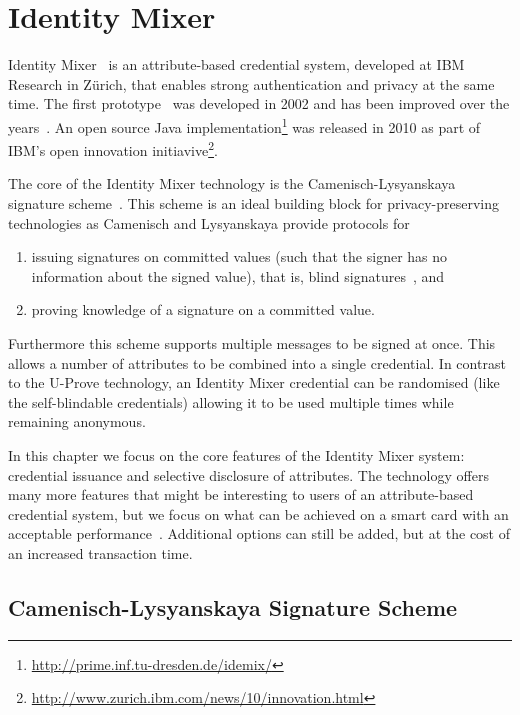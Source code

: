 \chapter{Identity Mixer\label{chp:idemix}}

Identity Mixer~\cite{CamenischLysyanskaya2001,IdemixCrypto2012} is an
attribute-based credential system, developed at IBM Research in Z\"urich, that
enables strong authentication and privacy at the same time. The first
prototype~\cite{CamenischH02} was developed in 2002 and has been improved over
the years~\cite{BrickellCC2004,CamenischGroth2004}. An open source Java
implementation\footnote{\url{http://prime.inf.tu-dresden.de/idemix/}} was
released in 2010 as part of IBM's open innovation
initiavive\footnote{\url{http://www.zurich.ibm.com/news/10/innovation.html}}.

The core of the Identity Mixer technology is the Camenisch-Lysyanskaya signature
scheme~\cite{CamenischLysyanskaya2003,Lysyanskaya2002}. This scheme is an ideal
building block for privacy-preserving technologies as Camenisch and Lysyanskaya
provide protocols for
\begin{enumerate}
  \item issuing signatures on committed values (such that the signer has no
    information about the signed value), that is, blind
    signatures~\cite{Chaum1983}, and
  \item proving knowledge of a signature on a committed value.
\end{enumerate}
Furthermore this scheme supports multiple messages to be signed at once. This
allows a number of attributes to be combined into a single credential. In
contrast to the U-Prove technology, an Identity Mixer credential can be
randomised (like the self-blindable credentials) allowing it to be used multiple
times while remaining anonymous.

In this chapter we focus on the core features of the Identity Mixer system:
credential issuance and selective disclosure of attributes. The technology
offers many more features that might be interesting to users of an
attribute-based credential system, but we focus on what can be achieved on a
smart card with an acceptable performance~\cite{VullersAlpar2013}. Additional
options can still be added, but at the cost of an increased transaction time.

\section{Camenisch-Lysyanskaya Signature Scheme\label{sec:CL-scheme}}

